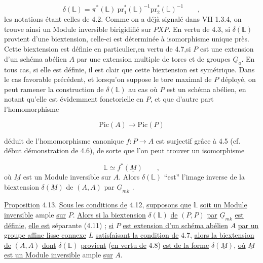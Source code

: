 \begin{equation}\tag{4.12.1}
\delta(\mathbb{L}) = \pi^{*}(\mathbb{L})\ \mathrm{pr}_{1}^{*}(\mathbb{L})^{-1}\mathrm{pr}_{2}^{*}(\mathbb{L})^{-1} \qquad ,
\end{equation}
les notations étant celles de 4.2. Comme on a déjà signalé dans VII 1.3.4, on trouve ainsi un Module inversible birigidifié sur $PXP$. En vertu de 4.3, si $\delta(\mathbb{L})$ provient d'une biextension, celle-ci est déterminée à isomorphisme unique près. Cette biextension est définie en particulier,en vertu de 4.7,si $P$ est une extension d'un schéma abélien $A$ par une extension multiple de tores et de groupes $\underline{G}_a$. En tous cas, si elle est définie, il est clair que cette biextension est symétrique. Dans le cas favorable précédent, et lorsqu'on suppose le tore maximal de $P$ déployé, on peut ramener la construction de $\delta(\mathbb{L})$ au cas où $P$ est un schéma abélien, en notant qu'elle est évidemment fonctorielle en $P$, et que d'autre part l'homomorphisme

\begin{equation}\tag{4.12.2}
\mathrm{Pic}(A) \longrightarrow \mathrm{Pic}(P) 
\end{equation}


 déduit de l'homomorphisme canonique $f : P \longrightarrow A$ est surjectif grâce à 4.5 (cf. début démonstration de 4.6), de sorte que l'on peut trouver un isomorphisme

\begin{equation*}
\mathbb{L} \simeq f^{*}(\underline{M}) \qquad ,
\end{equation*}
où $\underline{M}$ est un Module inversible sur $A$. Alors $\delta(\mathbb{L})$ ``est'' l'image inverse de la biextension $\delta(\underline{M})$ de $(A,A)$ par $\underline{G}_{mk}$ .

\underline{Proposition} 4.13. \underline{Sous les conditions de} 4.12, \underline{supposons que} $\mathbb{L}$ \underline{soit un Module inversible} ample \underline{sur} $P$. \underline{Alors si la biextension} $\delta(\mathbb{L})$ \underline{de} $(P,P)$ \underline{par} $\underline{G}_{mk}$ \underline{est définie,} \underline{elle est} séparante (4.11) ; \underline{si} $P$ \underline{est extension d'un schéma abélien} $A$ \underline{par un groupe affine lisse connexe} $L$ \underline{satisfaisant la condition de} 4.7, \underline{alors la biextension de} $(A,A)$ \underline{dont} $\delta(\mathbb{L})$ \underline{provient} (\underline{en vertu de} 4.8) \underline{est de la forme} $\delta(\underline{M})$, \underline{où} $\underline{M}$ \underline{est un Module inversible} ample \underline{sur} $A$.

